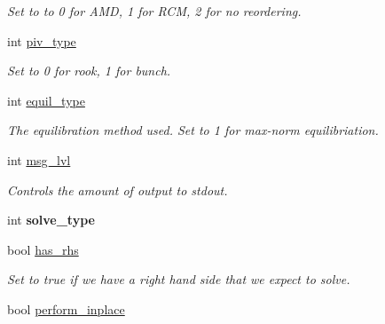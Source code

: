 \begin{DoxyCompactItemize}
\begin{DoxyCompactList}\small\item\em Set to to 0 for A\+MD, 1 for R\+CM, 2 for no reordering. \end{DoxyCompactList}\item 
int \hyperlink{classsymildl_1_1solver_a5e9913a3323340c88b40d1b75913aba1}{piv\+\_\+type}\hypertarget{classsymildl_1_1solver_a5e9913a3323340c88b40d1b75913aba1}{}\label{classsymildl_1_1solver_a5e9913a3323340c88b40d1b75913aba1}

\begin{DoxyCompactList}\small\item\em Set to 0 for rook, 1 for bunch. \end{DoxyCompactList}\item 
int \hyperlink{classsymildl_1_1solver_a96c730c12f38a41385e5e827ee372d06}{equil\+\_\+type}\hypertarget{classsymildl_1_1solver_a96c730c12f38a41385e5e827ee372d06}{}\label{classsymildl_1_1solver_a96c730c12f38a41385e5e827ee372d06}

\begin{DoxyCompactList}\small\item\em The equilibration method used. Set to 1 for max-\/norm equilibriation. \end{DoxyCompactList}\item 
int \hyperlink{classsymildl_1_1solver_a9a63f54a0bcfca9f94729568cc753516}{msg\+\_\+lvl}\hypertarget{classsymildl_1_1solver_a9a63f54a0bcfca9f94729568cc753516}{}\label{classsymildl_1_1solver_a9a63f54a0bcfca9f94729568cc753516}

\begin{DoxyCompactList}\small\item\em Controls the amount of output to stdout. \end{DoxyCompactList}\item 
int {\bfseries solve\+\_\+type}\hypertarget{classsymildl_1_1solver_a3eb05b73c95964d26394dd094cbd530e}{}\label{classsymildl_1_1solver_a3eb05b73c95964d26394dd094cbd530e}

\item 
bool \hyperlink{classsymildl_1_1solver_a75ee55007ceb5662387040dfa94572e6}{has\+\_\+rhs}\hypertarget{classsymildl_1_1solver_a75ee55007ceb5662387040dfa94572e6}{}\label{classsymildl_1_1solver_a75ee55007ceb5662387040dfa94572e6}

\begin{DoxyCompactList}\small\item\em Set to true if we have a right hand side that we expect to solve. \end{DoxyCompactList}\item 
bool \hyperlink{classsymildl_1_1solver_a832633b9ca934cf072b0c61910457b6c}{perform\+\_\+inplace}\hypertarget{classsymildl_1_1solver_a832633b9ca934cf072b0c61910457b6c}{}\label{classsymildl_1_1solver_a832633b9ca934cf072b0c61910457b6c}


\end{DoxyCompactItemize}
